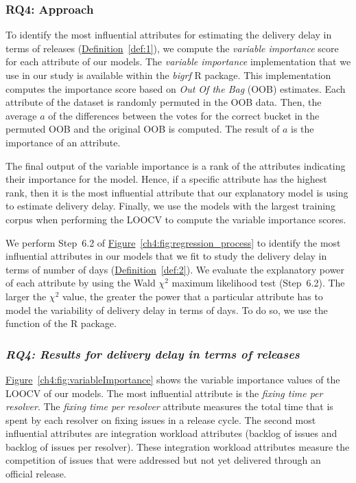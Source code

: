 \subsubsection*{RQ4: Approach}

To identify the most influential attributes for estimating the delivery delay
in terms of releases (\hyperref[def:1]{Definition}~\ref{def:1}), we compute the
\textit{variable importance} score for each attribute of our models. The
\textit{variable importance} implementation that we use in our study is
available within the \textit{bigrf} R package. This implementation computes the
importance score based on {\em Out Of the Bag} (OOB) estimates. Each attribute
of the dataset is randomly permuted in the OOB data.  Then, the average \(a\) of
the differences between the votes for the correct bucket in the permuted OOB and
the original OOB is computed. The result of \(a\) is the importance of an
attribute. 

The final output of the variable importance is a rank of the attributes
indicating their importance for the model. Hence, if a specific attribute has
the highest rank, then it is the most influential attribute that our explanatory
model is using to estimate delivery delay. Finally, we use the models with the
largest training corpus when performing the LOOCV to compute the variable
importance scores.

We perform Step~6.2 of
\hyperref[ch4:fig:regression_process]{Figure}~\ref{ch4:fig:regression_process} to
identify the most influential attributes in our models that we fit to study the
delivery delay in terms of number of days
(\hyperref[def:2]{Definition}~\ref{def:2}). We evaluate the explanatory power of
each attribute by using the Wald $\chi^2$ maximum likelihood test (Step~6.2).
The larger the $\chi^2$ value, the greater the power that a particular attribute
has to model the variability of delivery delay in terms of days. To do so, we
use the  function of the  R package.

\subsubsection*{\textit{\textbf{RQ4: Results for delivery delay in terms of
releases}}}

\noindent{}
\hyperref[ch4:fig:variableImportance]{Figure}~\ref{ch4:fig:variableImportance} shows the
variable importance values of the LOOCV of our models. The most influential
attribute is the \textit{fixing time per resolver}. The \textit{fixing time per
resolver} attribute measures the total time that is spent by each resolver on
fixing issues in a release cycle. The second most influential attributes are
integration workload attributes (\ie backlog of issues and backlog of issues per
resolver). These integration workload attributes measure the competition of
issues that were addressed but not yet delivered through an official release.


